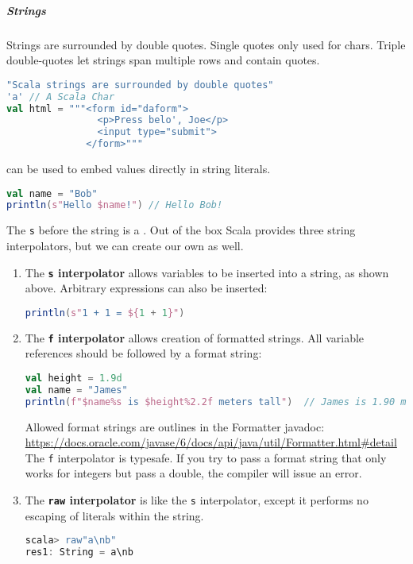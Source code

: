\subparagraph{Strings}
Strings are surrounded by double quotes. Single quotes only used for chars. Triple double-quotes let strings span multiple rows and contain quotes.
\begin{lstlisting}[language=scala, style=snippet]
"Scala strings are surrounded by double quotes"
'a' // A Scala Char
val html = """<form id="daform">
                <p>Press belo', Joe</p>
                <input type="submit">
              </form>"""
\end{lstlisting}
 can be used to embed values directly in string literals.
\begin{lstlisting}[language=scala, style=snippet]
val name = "Bob"
println(s"Hello $name!") // Hello Bob!
\end{lstlisting}
The \texttt{s} before the string is a . Out of the box Scala provides three string interpolators, but we can create our own as well.
\begin{enumerate}
\item The \textbf{\texttt{s} interpolator} allows variables to be inserted into a string, as shown above. Arbitrary expressions can also be inserted:
\begin{lstlisting}[language=scala, style=snippet]
println(s"1 + 1 = ${1 + 1}")
\end{lstlisting}
\item The \textbf{\texttt{f} interpolator} allows creation of formatted strings. All variable references should be followed by a format string:
\begin{lstlisting}[language=scala, style=snippet]
val height = 1.9d
val name = "James"
println(f"$name%s is $height%2.2f meters tall")  // James is 1.90 meters tall
\end{lstlisting}
Allowed format strings are outlines in the Formatter javadoc: \url{https://docs.oracle.com/javase/6/docs/api/java/util/Formatter.html#detail}
The \texttt{f} interpolator is typesafe. If you try to pass a format string that only works for integers but pass a double, the compiler will issue an error.
\item The \textbf{\texttt{raw} interpolator} is like the \texttt{s} interpolator, except it performs no escaping of literals within the string.
\begin{lstlisting}[language=scala, style=snippet]
scala> raw"a\nb"
res1: String = a\nb
\end{lstlisting}
\end{enumerate}

